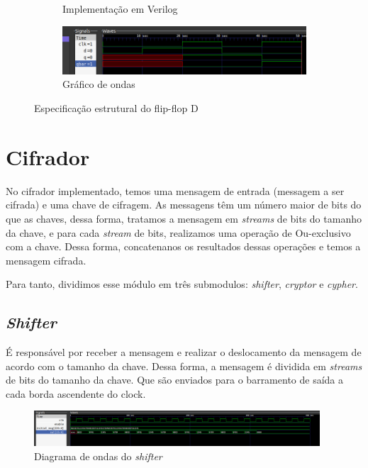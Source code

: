 \documentclass{article}
\begin{document}
\begin{figure}[H]
\begin{subfigure}[c]{0.3\textwidth}
        \caption{Implementação em Verilog}
        \label{fig:structural_specification}
    \end{subfigure}
    \hfill
    \begin{subfigure}[c]{0.6\textwidth}
        \centering
        \includegraphics[width=\textwidth]{images/dflipflop_structural_wave.png}
        \caption{Gráfico de ondas}
        \label{fig:structural_wave}
    \end{subfigure}
    \hfill
    \caption{Especificação estrutural do flip-flop D}

\end{figure}

\section{Cifrador}

No cifrador implementado, temos uma mensagem de entrada (messagem a ser cifrada) e uma chave de cifragem. As messagens têm um número maior de bits do que as chaves, dessa forma, tratamos a mensagem em \emph{streams} de bits do tamanho da chave, e para cada \emph{stream} de bits, realizamos uma operação de Ou-exclusivo com a chave. Dessa forma, concatenanos os resultados dessas operações e temos a mensagem cifrada.

Para tanto, dividimos esse módulo em três submodulos: \emph{shifter},  \emph{cryptor} e \emph{cypher}.

\subsection{\emph{Shifter}}

É responsável por receber a mensagem e realizar o deslocamento da mensagem de acordo com o tamanho da chave. Dessa forma, a mensagem é dividida em \emph{streams} de bits do tamanho da chave. Que são enviados para o barramento de saída a cada borda ascendente do clock.

\begin{figure}[H]
    \centering
    \includegraphics[width=0.95\textwidth]{images/shifter_wave.png}
    \caption{Diagrama de ondas do \emph{shifter}}
    \label{fig:shifter}
\end{figure}
\end{document}
